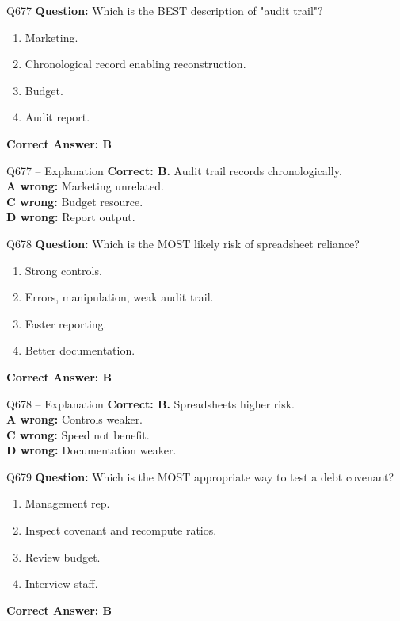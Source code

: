 \documentclass[aspectratio=169,10pt]{beamer}
\begin{document}
	\begin{frame}[t]{Q677}
		\small
		\textbf{Question:} Which is the BEST description of "audit trail"?
		\begin{enumerate}[label=\Alph*.,itemsep=1pt,topsep=2pt]
			\item Marketing.
			\item Chronological record enabling reconstruction.
			\item Budget.
			\item Audit report.
		\end{enumerate}
		\vspace{4pt}
		\textbf{Correct Answer: B}
	\end{frame}
	
	\begin{frame}[t]{Q677 -- Explanation}
		\small
		\textbf{Correct: B.} Audit trail records chronologically. \\[4pt]
		\textbf{A wrong:} Marketing unrelated. \\[2pt]
		\textbf{C wrong:} Budget resource. \\[2pt]
		\textbf{D wrong:} Report output.
	\end{frame}
	
	\begin{frame}[t]{Q678}
		\small
		\textbf{Question:} Which is the MOST likely risk of spreadsheet reliance?
		\begin{enumerate}[label=\Alph*.,itemsep=1pt,topsep=2pt]
			\item Strong controls.
			\item Errors, manipulation, weak audit trail.
			\item Faster reporting.
			\item Better documentation.
		\end{enumerate}
		\vspace{4pt}
		\textbf{Correct Answer: B}
	\end{frame}
	
	\begin{frame}[t]{Q678 -- Explanation}
		\small
		\textbf{Correct: B.} Spreadsheets higher risk. \\[4pt]
		\textbf{A wrong:} Controls weaker. \\[2pt]
		\textbf{C wrong:} Speed not benefit. \\[2pt]
		\textbf{D wrong:} Documentation weaker.
	\end{frame}
	
	\begin{frame}[t]{Q679}
		\small
		\textbf{Question:} Which is the MOST appropriate way to test a debt covenant?
		\begin{enumerate}[label=\Alph*.,itemsep=1pt,topsep=2pt]
			\item Management rep.
			\item Inspect covenant and recompute ratios.
			\item Review budget.
			\item Interview staff.
		\end{enumerate}
		\vspace{4pt}
		\textbf{Correct Answer: B}
	\end{frame}
	
\end{document}
